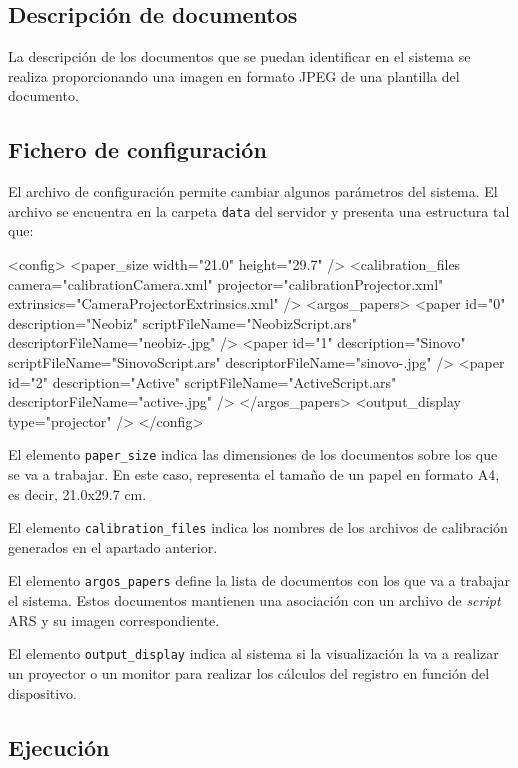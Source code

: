 \subsection{Descripción de documentos}

La descripción de los documentos que se puedan identificar en el sistema se realiza proporcionando
una imagen en formato JPEG de una plantilla del documento.

\subsection{Fichero de configuración}

El archivo de configuración permite cambiar algunos parámetros del sistema. El archivo se encuentra
en la carpeta \texttt{data} del servidor y presenta una estructura tal que:

\begin{listing}[%
  language = XML]
<config>
  <paper_size width="21.0" height="29.7" />
  <calibration_files camera="calibrationCamera.xml"
    projector="calibrationProjector.xml"
    extrinsics="CameraProjectorExtrinsics.xml" />
  <argos_papers>
    <paper id="0" description="Neobiz"
      scriptFileName="NeobizScript.ars"
      descriptorFileName="neobiz-.jpg" />
    <paper id="1" description="Sinovo"
      scriptFileName="SinovoScript.ars"
      descriptorFileName="sinovo-.jpg" />
    <paper id="2" description="Active"
      scriptFileName="ActiveScript.ars"
      descriptorFileName="active-.jpg" />
  </argos_papers>
  <output_display type="projector" />
</config>
\end{listing}

El elemento \texttt{paper\_size} indica las dimensiones de los documentos sobre los que se va a
trabajar. En este caso, representa el tamaño de un papel en formato A4, es decir, 21.0x29.7 cm.

El elemento \texttt{calibration\_files} indica los nombres de los archivos de calibración generados
en el apartado anterior.

El elemento \texttt{argos\_papers} define la lista de documentos con los que va a trabajar el
sistema. Estos documentos mantienen una asociación con un archivo de \textit{script} ARS y su
imagen correspondiente.

El elemento \texttt{output\_display} indica al sistema si la visualización la va a realizar un
proyector o un monitor para realizar los cálculos del registro en función del dispositivo.


\subsection{Ejecución}

